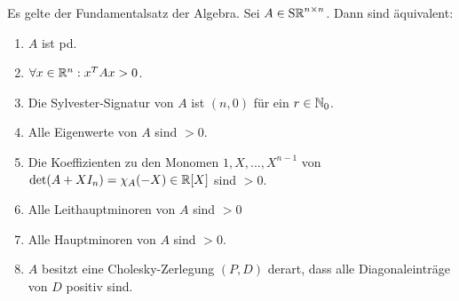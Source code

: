 \documentclass[../../main.tex]{subfiles}
\begin{document}
\begin{sat}\label{14.2.13}
Es gelte der Fundamentalsatz der Algebra. Sei $A\in\operatorname{S\mathbb R}^{n\times n}$. Dann sind äquivalent:
\begin{enumerate}[\normalfont(a)]
\item $A$ ist pd.
\item $\forall x\in \mathbb R^n: x^TAx> 0$.
\item Die Sylvester-Signatur von $A$ ist $(n,0)$ für ein $r\in \mathbb N_0$.
\item Alle Eigenwerte von $A$ sind $> 0$.
\item Die Koeffizienten zu den Monomen $1,X,...,X^{n-1}$ von $\det(A+XI_n)=\chi_A(-X)\in \mathbb R[X]$ sind $> 0$.
\item Alle Leithauptminoren von $A$ sind $>0$
\item Alle Hauptminoren von $A$ sind $>0$.
\item $A$ besitzt eine Cholesky-Zerlegung $(P,D)$ derart, dass alle Diagonaleinträge von $D$ positiv sind.
\end{enumerate}	 
\end{sat}
\end{document}
